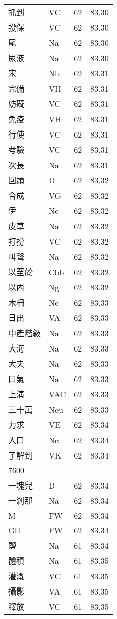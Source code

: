 \documentclass[twocolumn]{book}
\begin{document}
\begin{supertabular}{llrr}
抓到 & VC & 62 &  83.30\\
投保 & VC & 62 &  83.30\\
尾 & Na & 62 &  83.30\\
尿液 & Na & 62 &  83.30\\
宋 & Nb & 62 &  83.31\\
完備 & VH & 62 &  83.31\\
妨礙 & VC & 62 &  83.31\\
免疫 & VH & 62 &  83.31\\
行使 & VC & 62 &  83.31\\
考驗 & VC & 62 &  83.31\\
次長 & Na & 62 &  83.31\\
回頭 & D & 62 &  83.32\\
合成 & VG & 62 &  83.32\\
伊 & Nc & 62 &  83.32\\
皮草 & Na & 62 &  83.32\\
打扮 & VC & 62 &  83.32\\
叫聲 & Na & 62 &  83.32\\
以至於 & Cbb & 62 &  83.32\\
以內 & Ng & 62 &  83.32\\
木柵 & Nc & 62 &  83.33\\
日出 & VA & 62 &  83.33\\
中產階級 & Na & 62 &  83.33\\
大海 & Na & 62 &  83.33\\
大夫 & Na & 62 &  83.33\\
口氣 & Na & 62 &  83.33\\
上演 & VAC & 62 &  83.33\\
三十萬 & Neu & 62 &  83.33\\
力求 & VE & 62 &  83.34\\
入口 & Nc & 62 &  83.34\\
了解到 & VK & 62 &  83.34\\
7600\\
一塊兒 & D & 62 &  83.34\\
一剎那 & Na & 62 &  83.34\\
M & FW & 62 &  83.34\\
GII & FW & 62 &  83.34\\
鹽 & Na & 61 &  83.34\\
體積 & Na & 61 &  83.35\\
灌溉 & VC & 61 &  83.35\\
攝影 & VA & 61 &  83.35\\
釋放 & VC & 61 &  83.35\\

\end{supertabular}
\end{document}
